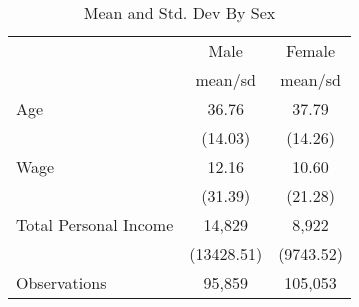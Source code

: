 \begin{table}[htbp]\centering
\def\sym#1{\ifmmode^{#1}\else\(^{#1}\)\fi}
\caption{Mean and Std. Dev By Sex\label{sex}}
\begin{tabular}{l*{2}{c}}
\toprule
                    &\multicolumn{1}{c}{Male}&\multicolumn{1}{c}{Female}\\
                    &     mean/sd&     mean/sd\\
\midrule
Age                 &       36.76&       37.79\\
                    &     (14.03)&     (14.26)\\
\addlinespace
Wage                &       12.16&       10.60\\
                    &     (31.39)&     (21.28)\\
\addlinespace
Total Personal Income&      14,829&       8,922\\
                    &  (13428.51)&   (9743.52)\\
\midrule
Observations        &      95,859&     105,053\\
\bottomrule
\end{tabular}
\end{table}
